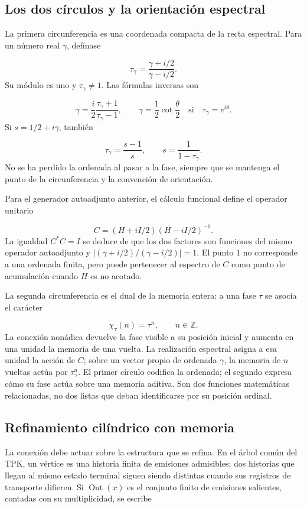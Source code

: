 \subsection{Los dos círculos y la orientación espectral}
\label{viii:rz:circulos}
La primera circunferencia es una coordenada compacta de la recta espectral. Para un número real \(\gamma\), defínase

\[
\tau_\gamma=\frac{\gamma+i/2}{\gamma-i/2}.
\]
Su módulo es uno y \(\tau_\gamma\neq1\). Las fórmulas inversas son

\[
\gamma=\frac{i}{2}\frac{\tau_\gamma+1}{\tau_\gamma-1},
\qquad
\gamma=\frac12\cot\frac{\theta}{2}
\quad\text{si}\quad\tau_\gamma=e^{i\theta}.
\]
Si \(s=1/2+i\gamma\), también

\[
\tau_\gamma=\frac{s-1}{s},\qquad s=\frac1{1-\tau_\gamma}.
\]
No se ha perdido la ordenada al pasar a la fase, siempre que se mantenga el punto de la circunferencia y la convención de orientación.

Para el generador autoadjunto anterior, el cálculo funcional define el operador unitario

\[
C=(H+iI/2)(H-iI/2)^{-1}.
\]
La igualdad \(C^*C=I\) se deduce de que los dos factores son funciones del mismo operador autoadjunto y \(|(\gamma+i/2)/(\gamma-i/2)|=1\). El punto \(1\) no corresponde a una ordenada finita, pero puede pertenecer al espectro de \(C\) como punto de acumulación cuando \(H\) es no acotado.

La segunda circunferencia es el dual de la memoria entera: a una fase \(\tau\) se asocia el carácter

\[
\chi_\tau(n)=\tau^n,\qquad n\in\mathbb Z.
\]
La conexión nonádica devuelve la fase visible a su posición inicial y aumenta en una unidad la memoria de una vuelta. La realización espectral asigna a esa unidad la acción de \(C\); sobre un vector propio de ordenada \(\gamma\), la memoria de \(n\) vueltas actúa por \(\tau_\gamma^n\). El primer círculo codifica la ordenada; el segundo expresa cómo su fase actúa sobre una memoria aditiva. Son dos funciones matemáticas relacionadas, no dos listas que deban identificarse por su posición ordinal.

\subsection{Refinamiento cilíndrico con memoria}
\label{viii:rz:refinamiento}
La conexión debe actuar sobre la estructura que se refina. En el árbol común del TPK, un vértice es una historia finita de emisiones admisibles; dos historias que llegan al mismo estado terminal siguen siendo distintas cuando sus registros de transporte difieren. Si \(\operatorname{Out}(x)\) es el conjunto finito de emisiones salientes, contadas con su multiplicidad, se escribe

